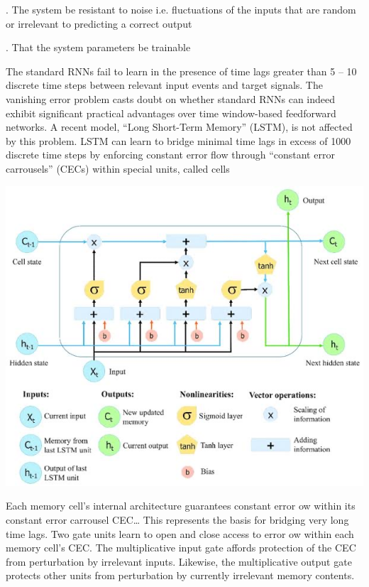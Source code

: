 \documentclass[12pt]{article}
\newcommand{\nd}{\noindent}
\begin{document}
\nd 2. The system be resistant to noise i.e. fluctuations of the inputs that are random or irrelevant to predicting a correct output

\nd 3. That the system parameters be trainable 

\nd The standard RNNs fail to learn in the presence of time lags greater than 5 – 10 discrete time steps between relevant input events and target signals. The vanishing error problem casts doubt on whether standard RNNs can indeed exhibit significant practical advantages over time window-based feedforward networks. A recent model, “Long Short-Term Memory” (LSTM), is not affected by this problem. LSTM can learn to bridge minimal time lags in excess of 1000 discrete time steps by enforcing constant error flow through “constant error carrousels” (CECs) within special units, called cells

\begin{center}
\centerline{\includegraphics[scale=.5]{lstm.jpg}}
\end{center}

\nd Each memory cell’s internal architecture guarantees constant error ow within its constant error carrousel CEC… This represents the basis for bridging very long time lags. Two gate units learn to open and close access to error ow within each memory cell’s CEC. The multiplicative input gate affords protection of the CEC from perturbation by irrelevant inputs. Likewise, the multiplicative output gate protects other units from perturbation by currently irrelevant memory contents.
\end{document}
